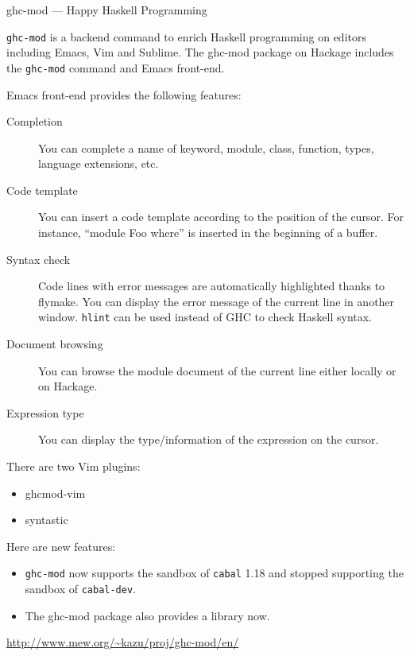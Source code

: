 \begin{hcarentry}[updated]{ghc-mod --- Happy Haskell Programming}
\makeheader

{\tt ghc-mod} is a backend command to enrich Haskell programming on editors including Emacs, Vim and Sublime. The ghc-mod package on Hackage includes the {\tt ghc-mod} command and Emacs front-end. 

Emacs front-end provides the following features:

\begin{description}
\item[Completion] You can complete a name of keyword, module, class, function, types, language extensions, etc.

\item[Code template] You can insert a code template according to the position of the cursor. For instance, ``module Foo where'' is inserted in the beginning of a buffer.

\item[Syntax check] Code lines with error messages are automatically highlighted thanks to flymake. You can display the error message of the current line in another window. {\tt hlint} %
can be used instead of GHC to check Haskell syntax. 

\item[Document browsing] You can browse the module document of the current line either locally or on Hackage.

\item[Expression type] You can display the type/information of the expression on the cursor. 
\end{description}

\noindent
There are two Vim plugins:
\begin{itemize}
\item ghcmod-vim
\item syntastic
\end{itemize}

\noindent
Here are new features:
\begin{itemize}
\item {\tt ghc-mod} now supports the sandbox of {\tt cabal} 1.18 and stopped supporting the sandbox of {\tt cabal-dev}.
\item The ghc-mod package also provides a library now.
\end{itemize}

\FurtherReading
  \url{http://www.mew.org/~kazu/proj/ghc-mod/en/}
\end{hcarentry}
